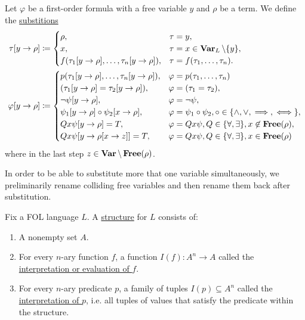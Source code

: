 \begin{definition}\label{def:first_order_substition}
  Let $\varphi$ be a first-order formula with a free variable $y$ and $\rho$ be a term. We define the \uline{substitions}
  \begin{align*}
    \tau[y \to \rho] &\coloneqq \begin{cases}
      \rho,                                              &\tau = y, \\
      x,                                                 &\tau = x \in \operatorname{\mathbf{Var}}_L \setminus \{ y \}, \\
      f(\tau_1[y \to \rho], \ldots, \tau_n[y \to \rho]), &\tau = f(\tau_1, \ldots, \tau_n).
    \end{cases}
    \\
    \varphi[y \to \rho] &\coloneqq \begin{cases}
      p(\tau_1[y \to \rho], \ldots, \tau_n[y \to \rho]), &\varphi = p(\tau_1, \ldots, \tau_n) \\
      (\tau_1[y \to \rho] = \tau_2[y \to \rho]),         &\varphi = (\tau_1 = \tau_2), \\
      \neg \psi[y \to \rho],                             &\varphi = \neg \psi, \\
      \psi_1[y \to \rho] \circ \psi_2[x \to \rho],       &\varphi = \psi_1 \circ \psi_2, \circ \in \{ \land, \lor, \implies, \iff \}, \\
      Q x \psi[y \to \rho] = T,                          &\varphi = Q x \psi, Q \in \{ \forall, \exists \}, x \not\in \operatorname{\mathbf{Free}}(\rho), \\
      Q x \psi[y \to \rho[x \to z]] = T,                 &\varphi = Q x \psi, Q \in \{ \forall, \exists \}, x \in \operatorname{\mathbf{Free}}(\rho)
    \end{cases}
  \end{align*}
  where in the last step $z \in \operatorname{\mathbf{Var}} \setminus \operatorname{\mathbf{Free}}(\rho)$.

  In order to be able to substitute more that one variable simultaneously, we preliminarily rename colliding free variables and then rename them back after substitution.
\end{definition}

\begin{definition}\label{def:first_order_structure}\cite[25]{Lectures:logic_programming}
  Fix a FOL language $L$. A \uline{structure} for $L$ consists of:
  \begin{enumerate}
    \item A nonempty set $A$.
    \item For every $n$-ary function $f$, a function $I(f): A^n \to A$ called the \uline{interpretation or evaluation of $f$}.
    \item For every $n$-ary predicate $p$, a family of tuples $I(p) \subseteq A^n$ called the \uline{interpretation of $p$}, i.e. all tuples of values that satisfy the predicate within the structure.
  \end{enumerate}
\end{definition}

